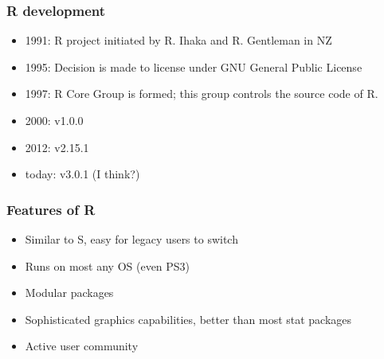 \documentclass[11pt,ignorenonframetext,aspectratio=169]{beamer}
\begin{document}
\begin{frame}\frametitle{R development}

\begin{itemize}[<+->]

\item
  1991: R project initiated by R. Ihaka and R. Gentleman in NZ
\item
  1995: Decision is made to license under GNU General Public License
\item
  1997: R Core Group is formed; this group controls the source code of
  R.
\item
  2000: v1.0.0
\item
  2012: v2.15.1
\item
  today: v3.0.1 (I think?)
\end{itemize}

\end{frame}

\begin{frame}\frametitle{Features of R}

\begin{itemize}[<+->]

\item
  Similar to S, easy for legacy users to switch
\item
  Runs on most any OS (even PS3)
\item
  Modular packages
\item
  Sophisticated graphics capabilities, better than most stat packages
\item
  Active user community
\end{itemize}

\end{frame}
\end{document}
